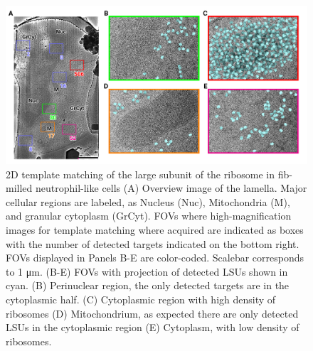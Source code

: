 \documentclass[
]{article}
\begin{document}
\begin{figure}
\hypertarget{fig:initmatching}{%
\centering
\includegraphics{figures/initmatching.png}
\caption{2D template matching of the large subunit of the ribosome in fib-milled neutrophil-like cells
(A) Overview image of the lamella. Major cellular regions are labeled, as Nucleus (Nuc), Mitochondria (M), and granular cytoplasm (GrCyt). FOVs where high-magnification images for template matching where acquired are indicated as boxes with the number of detected targets indicated on the bottom right. FOVs displayed in Panels B-E are color-coded. Scalebar corresponds to 1 μm.
(B-E) FOVs with projection of detected LSUs shown in cyan. (B) Perinuclear region, the only detected targets are in the cytoplasmic half. (C) Cytoplasmic region with high density of ribosomes (D) Mitochondrium, as expected there are only detected LSUs in the cytoplasmic region (E) Cytoplasm, with low density of ribosomes.}\label{fig:initmatching}
}
\end{figure}
\end{document}

